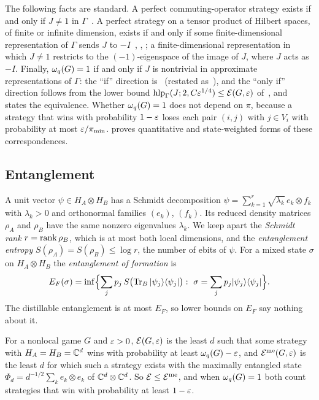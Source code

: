 The following facts are standard. A perfect commuting-operator strategy exists if and only if $J\ne1$ in $\Gamma$~\cite[Theorem~4]{CLS17}.
A perfect strategy on a tensor product of Hilbert spaces, of finite or infinite dimension, exists if and only if some finite-dimensional
representation of $\Gamma$ sends $J$ to $-I$~\cite[Theorem~1]{CM14}, \cite[Theorem~5]{CLS17}, \cite[Theorem~3.2]{Slo19}; a
finite-dimensional representation in which $J\ne1$ restricts to the $(-1)$-eigenspace of the image of $J$, where $J$ acts as $-I$. Finally, $\omega_{q}(G)=1$ if
and only if $J$ is nontrivial in approximate representations of $\Gamma$: the ``if'' direction is~\cite[Proposition~3.4]{Slo19}
(restated as~\cite[Proposition~4.3]{SV18}), and the ``only if'' direction follows from the lower bound
$\operatorname{hlp}_\Gamma(J;2,C\varepsilon^{1/4})\le\mathcal E(G,\varepsilon)$ of~\cite[Corollary~5.2]{SV18}, and~\cite[Corollary~5.3]{SV18} states the equivalence. Whether $\omega_{q}(G)=1$ does not depend on $\pi$, because a
strategy that wins with probability $1-\varepsilon$ loses each pair $(i,j)$ with $j\in V_i$ with probability at most $\varepsilon/\pi_{\min}$.
 proves quantitative and state-weighted forms of these correspondences.

\subsection{Entanglement}

A unit vector $\psi\in H_A\otimes H_B$ has a Schmidt decomposition $\psi=\sum_{k=1}^r\sqrt{\lambda_k}\,e_k\otimes f_k$ with $\lambda_k>0$
and orthonormal families $(e_k)$, $(f_k)$. Its reduced density matrices $\rho_A$ and $\rho_B$ have the same nonzero eigenvalues
$\lambda_k$. We keep apart the \emph{Schmidt rank} $r=\operatorname{rank}\rho_B$, which is at most both local dimensions, and the \emph{entanglement
entropy} $S(\rho_A)=S(\rho_B)\le\log r$, the number of ebits of $\psi$. For a mixed state $\sigma$ on $H_A\otimes H_B$ the
\emph{entanglement of formation} is~\cite{BDSW96}
\[
E_F(\sigma)=\inf\Bigl\{\sum_jp_j\,S\bigl(\Tr_B|\psi_j\rangle\langle\psi_j|\bigr):\ \sigma=\sum_jp_j|\psi_j\rangle\langle\psi_j|\Bigr\}.
\]
The distillable entanglement is at most $E_F$, so lower bounds on $E_F$ say nothing about it.

\begin{definition}\label{def:entanglement}
For a nonlocal game $G$ and $\varepsilon>0$, $\mathcal E(G,\varepsilon)$ is the least $d$ such that some strategy with $H_A=H_B=\mathbb C^d$ wins with probability at
least $\omega_{q}(G)-\varepsilon$, and $\mathcal E^{\mathrm{me}}(G,\varepsilon)$ is the least $d$ for which such a strategy exists with the maximally entangled state
$\Phi_d=d^{-1/2}\sum_ke_k\otimes e_k$ of $\mathbb C^d\otimes\mathbb C^d$. So $\mathcal E\le\mathcal E^{\mathrm{me}}$, and when $\omega_{q}(G)=1$ both count strategies that win with
probability at least $1-\varepsilon$.
\end{definition}

